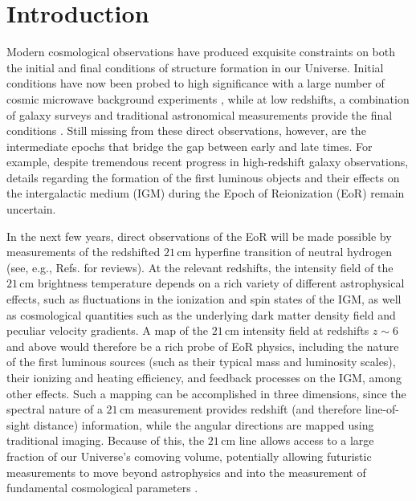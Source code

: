 \documentclass[twocolumn,aps,prd,nofootinbib,showpacs]{revtex4-1}
\begin{document}
\maketitle
\section{Introduction}

Modern cosmological observations have produced exquisite constraints on both the initial and final conditions of structure formation in our Universe.  Initial conditions have now been probed to high significance with a large number of cosmic microwave background experiments \cite{HinshawEtAl2013,Planck}, while at low redshifts, a combination of galaxy surveys and traditional astronomical measurements provide the final conditions \cite{SDSS}.  Still missing from these direct observations, however, are the intermediate epochs that bridge the gap between early and late times.  For example, despite tremendous recent progress in high-redshift galaxy observations, details regarding the formation of the first luminous objects and their effects on the intergalactic medium (IGM) during the Epoch of Reionization (EoR) remain uncertain.

In the next few years, direct observations of the EoR will be made possible by measurements of the redshifted $21\,\textrm{cm}$ hyperfine transition of neutral hydrogen (see, e.g., Refs. \cite{Furlanetto2006,Morales2010,Pritchard2012,AviBook} for reviews).  At the relevant redshifts, the intensity field of the $21\,\textrm{cm}$ brightness temperature depends on a rich variety of different astrophysical effects, such as fluctuations in the ionization and spin states of the IGM, as well as cosmological quantities such as the underlying dark matter density field and peculiar velocity gradients.  A map of the $21\,\textrm{cm}$ intensity field at redshifts $z \sim 6$ and above would therefore be a rich probe of EoR physics, including the nature of the first luminous sources (such as their typical mass and luminosity scales), their ionizing and heating efficiency, and feedback processes on the IGM, among other effects.  Such a mapping can be accomplished in three dimensions, since the spectral nature of a $21\,\textrm{cm}$ measurement provides redshift (and therefore line-of-sight distance) information, while the angular directions are mapped using traditional imaging.  Because of this, the $21\,\textrm{cm}$ line allows access to a large fraction of our Universe's comoving volume, potentially allowing futuristic measurements to move beyond astrophysics and into the measurement of fundamental cosmological parameters \cite{McQuinn2006,Bowman2007,Mao2008}.
\end{document}
